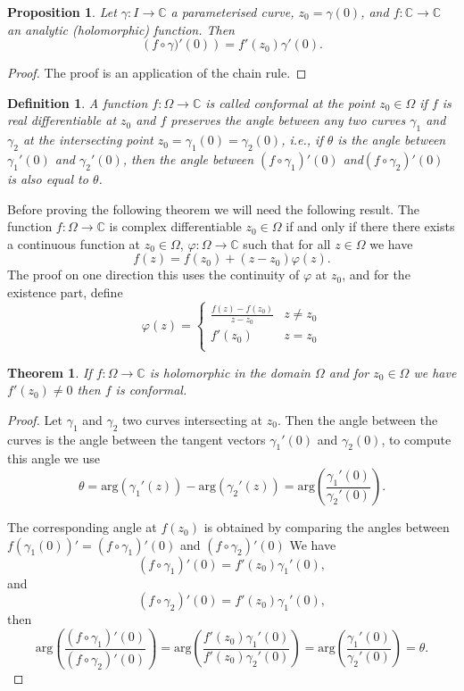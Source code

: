 \documentclass{amsart}
\newtheorem{thm}{Theorem}
\newtheorem{prop}{Proposition}
\newtheorem{mydef}{Definition}
\begin{document}
\begin{prop}
Let \(\gamma:I \to \mathbb{C}\) a parameterised curve, \(z_0 = \gamma(0)\), and \(f:\mathbb{C}\to \mathbb{C}\) an analytic (holomorphic) function. Then
\[ \left( f\circ \gamma)'(0)\right) = f'(z_0) \gamma'(0). \]
\end{prop}
\begin{proof}
The proof is an application of the chain rule.
\end{proof}

\begin{mydef}
A function \(f:\Omega \to \mathbb{C}\) is called conformal at the point  \(z_0\in \Omega\)
if \(f\) is real differentiable at \(z_0\) and \(f\) preserves the angle between
any two curves \(\gamma_1\) and \(\gamma_2\) at the intersecting point \(z_0=\gamma_1(0)=\gamma_2(0)\), i.e., 
if \(\theta\) is the angle between \(\gamma_1'(0)\) and \(\gamma_2'(0)\), then 
the angle between \((f\circ \gamma_1)'(0)\) and\((f\circ \gamma_2)'(0)\) is also equal to \(\theta\).
\end{mydef}

Before proving the following theorem we will need the following result. The function \(f:\Omega \to \mathbb{C}\) is complex differentiable \(z_0\in \Omega\)  if and only if there there exists a continuous function at \(z_0\in \Omega\),  \(\varphi:\Omega \to \mathbb{C}\) such that for all \(z\in \Omega\) we have \[ f(z) = f(z_0) + (z-z_0)\varphi(z).\]
The proof on one direction this uses the continuity of \(\varphi\) at \(z_0\), and for the existence part, define 
\[ \varphi(z) = \left\{ \begin{array}{cc}
\frac{f(z) - f(z_0)}{z-z_0}  & z\neq z_0\\
f'(z_0)  & z = z_0\\
\end{array} \right. \]
\begin{thm}
If \(f:\Omega \to \mathbb{C}\) is holomorphic in the domain \(\Omega\) and for \(z_0\in \Omega\) we have \(f'(z_0) \neq 0\) then \(f\) is conformal.
\end{thm}
\begin{proof}
Let \(\gamma_1\) and \(\gamma_2\) two curves intersecting at \(z_0\). Then the angle between the curves is the angle between the tangent vectors \(\gamma_1'(0)\) and \(\gamma_2(0)\), to compute this angle we use
\[ \theta = \mbox{arg}(\gamma_1'(z)) - \mbox{arg}(\gamma_2'(z)) = \mbox{arg}\left(\frac{\gamma_1'(0)}{\gamma_2'(0)}\right). \] 

The corresponding angle at \(f(z_0)\) is obtained by comparing the angles between \(f(\gamma_1 (0))' = (f\circ \gamma_1)'(0)\) and  \((f\circ \gamma_2)'(0)\)
We have
\[ \left( f\circ \gamma_1\right)'(0) = f'(z_0) \gamma_1'(0), \]
and
\[ \left( f\circ \gamma_2\right)'(0) = f'(z_0) \gamma_1'(0), \]
then
\[ \mbox{arg}\left( \frac{\left(f\circ \gamma_1 \right)'(0)}{\left(f\circ \gamma_2\right)'(0)}\right) = \mbox{arg}\left(\frac{f'(z_0) \gamma_1'(0)}{f'(z_0) \gamma_2'(0)}\right) = \mbox{arg}\left(\frac{\gamma_1'(0)}{\gamma_2'(0)}\right) = \theta. \]
\end{proof}
\end{document}
